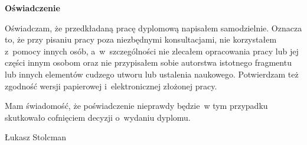 \newpage
\thispagestyle{empty}

\vspace*{2.5cm}
\begin{center}
	{
		\LARGE
		\textbf{Oświadczenie}
	}
\end{center}
\vspace*{0.1cm}

Oświadczam, że przedkładaną pracę dyplomową napisałem samodzielnie. Oznacza to, że przy pisaniu pracy poza niezbędnymi konsultacjami, nie korzystałem z~pomocy innych osób, a~w~szczególności nie zlecałem opracowania pracy lub jej części innym osobom oraz nie przypisałem sobie autorstwa istotnego fragmentu lub innych elementów cudzego utworu lub ustalenia naukowego. Potwierdzam też zgodność wersji papierowej i~elektronicznej złożonej pracy.

\vspace*{0.1cm}

Mam świadomość, że poświadczenie nieprawdy będzie~w tym przypadku skutkowało cofnięciem decyzji o~wydaniu dyplomu.

\vspace*{3cm}

\begin{flushright}
\begin{minipage}{5cm}
Łukasz Stolcman
\end{minipage}
\end{flushright}


